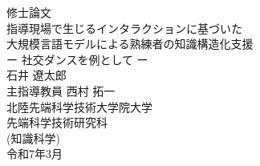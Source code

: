 \thispagestyle{empty}
\begin{center}
修士論文\\%
\vfill
指導現場で生じるインタラクションに基づいた\\
大規模言語モデルによる熟練者の知識構造化支援\\
ー 社交ダンスを例として ー\\
\vfill
石井 遼太郎\\
\vfill
主指導教員 西村 拓一\\
\vfill
北陸先端科学技術大学院大学\\
先端科学技術研究科\\
(知識科学)\\ %
\vfill
令和7年3月\\ %
\vfill
\end{center}

\clearpage